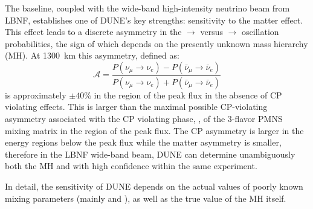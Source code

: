 
The  baseline, coupled with the wide-band
high-intensity neutrino beam from LBNF, establishes one of DUNE's key
strengths: sensitivity to the matter effect. This effect leads to a
discrete asymmetry in the \numu $\to$ \nue versus \anumu $\to$ \anue
oscillation probabilities, the sign of which depends on the presently
unknown mass hierarchy (MH).  At 1300~km this asymmetry, defined as:
\begin{equation}
\mathcal{A} = \frac{ P(\nu_\mu \rightarrow \nu_e)-P(\bar{\nu}_\mu \rightarrow \bar{\nu}_e)}{P(\nu_\mu \rightarrow \nu_e)+P(\bar{\nu}_\mu \rightarrow \bar{\nu}_e)}
\end{equation}
is approximately $\pm 40\%$ in the region of the peak flux in the
absence of CP violating effects. This is larger than the maximal
possible CP-violating asymmetry associated with the CP violating
phase, \deltacp, of the 3-flavor PMNS mixing matrix in the region of
the peak flux. The CP asymmetry is larger in the energy regions below the peak
flux while the matter asymmetry is smaller, therefore in the LBNF
wide-band beam, DUNE can determine unambiguously both the MH and
\deltacp with high confidence within the same experiment.

In detail, the sensitivity of DUNE depends on the actual values of
poorly known mixing parameters (mainly \deltacp and
), %
as well as the true value of the MH itself.  

